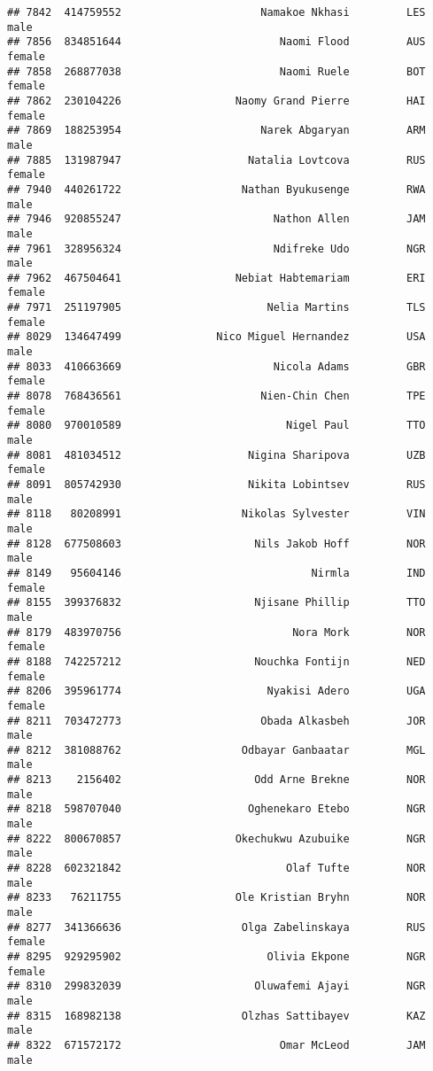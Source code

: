 \documentclass[]{article}
\begin{document}
\begin{verbatim}
## 7842  414759552                      Namakoe Nkhasi         LES   male
## 7856  834851644                         Naomi Flood         AUS female
## 7858  268877038                         Naomi Ruele         BOT female
## 7862  230104226                  Naomy Grand Pierre         HAI female
## 7869  188253954                      Narek Abgaryan         ARM   male
## 7885  131987947                    Natalia Lovtcova         RUS female
## 7940  440261722                   Nathan Byukusenge         RWA   male
## 7946  920855247                        Nathon Allen         JAM   male
## 7961  328956324                        Ndifreke Udo         NGR   male
## 7962  467504641                  Nebiat Habtemariam         ERI female
## 7971  251197905                       Nelia Martins         TLS female
## 8029  134647499               Nico Miguel Hernandez         USA   male
## 8033  410663669                        Nicola Adams         GBR female
## 8078  768436561                      Nien-Chin Chen         TPE female
## 8080  970010589                          Nigel Paul         TTO   male
## 8081  481034512                    Nigina Sharipova         UZB female
## 8091  805742930                    Nikita Lobintsev         RUS   male
## 8118   80208991                   Nikolas Sylvester         VIN   male
## 8128  677508603                     Nils Jakob Hoff         NOR   male
## 8149   95604146                              Nirmla         IND female
## 8155  399376832                     Njisane Phillip         TTO   male
## 8179  483970756                           Nora Mork         NOR female
## 8188  742257212                     Nouchka Fontijn         NED female
## 8206  395961774                       Nyakisi Adero         UGA female
## 8211  703472773                      Obada Alkasbeh         JOR   male
## 8212  381088762                   Odbayar Ganbaatar         MGL   male
## 8213    2156402                     Odd Arne Brekne         NOR   male
## 8218  598707040                    Oghenekaro Etebo         NGR   male
## 8222  800670857                  Okechukwu Azubuike         NGR   male
## 8228  602321842                          Olaf Tufte         NOR   male
## 8233   76211755                  Ole Kristian Bryhn         NOR   male
## 8277  341366636                   Olga Zabelinskaya         RUS female
## 8295  929295902                       Olivia Ekpone         NGR female
## 8310  299832039                     Oluwafemi Ajayi         NGR   male
## 8315  168982138                   Olzhas Sattibayev         KAZ   male
## 8322  671572172                         Omar McLeod         JAM   male

\end{verbatim}
\end{document}
